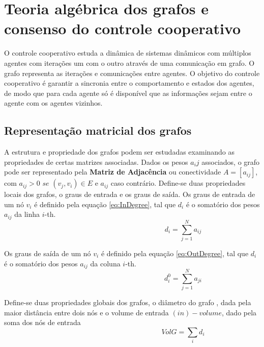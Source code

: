 \section{Teoria algébrica dos grafos e consenso do controle cooperativo}

O controle cooperativo estuda a dinâmica de sistemas dinâmicos com múltiplos agentes com iterações um com o outro através de uma comunicação em grafo. 
O grafo representa as iterações e comunicações entre agentes. O objetivo do controle cooperativo é garantir a sincronia entre o comportamento e estados dos agentes, de modo que para cada agente só é disponível que as informações sejam entre o agente com os agentes vizinhos.

\subsection{Representação matricial dos grafos}
A estrutura e propriedade dos grafos podem ser estudadas examinando as propriedades de certas matrizes associadas. Dados os pesos $a{_ij}$ associados, o grafo pode ser representado pela \textbf{Matriz de Adjacência} ou conectividade $A = [a_{ij}]$, com $a_{ij}>0$ $se$ $(v_{j},v_{i}) \in E $ e $a_{ij}$ caso contrário.   
Define-se duas propriedades locais dos grafos, o graus de entrada e os graus de saída.
Os graus de entrada de um nó $v_{i}$ é definido pela equação \ref{eq:InDegree}, tal que $d_{i}$ é o somatório dos pesos $a_{ij}$ da linha $i$-th.
\begin{equation} \label{eq:InDegree}
   \hspace{6cm} %
   d_{i} = \displaystyle\sum_{j=1}^{N}a_{ij}
\end{equation}

Os graus de saída de um nó $v_{i}$ é definido pela equação \ref{eq:OutDegree}, tal que $d_{i}$ é o somatório dos pesos $a_{ij}$ da coluna $i$-th.
\begin{equation}\label{eq:OutDegree}
\hspace{6cm} %
    d_{i}^0 = \displaystyle\sum_{j = 1}^{N}a_{ji}
\end{equation}

Define-se duas propriedades globais dos grafos, o diâmetro do grafo , dada pela maior distância entre dois nós e o volume de entrada $(in)-volume$, dado pela soma dos nós de entrada
\begin{equation}
\hspace{6cm} %
    VolG=\displaystyle\sum_{i}d_{i}
\end{equation}

